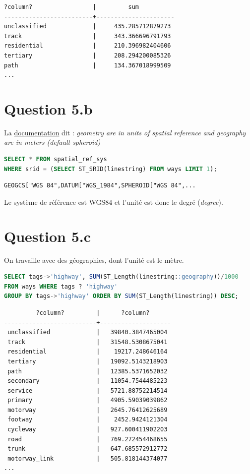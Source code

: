 \documentclass[12pt,a4paper]{article}
\begin{document}
\begin{lstlisting}
?column?                 |         sum          
-------------------------+----------------------
unclassified             |     435.285712879273
track                    |     343.366696791793
residential              |     210.396982404606
tertiary                 |     208.294200085326
path                     |     134.367018999509
...
\end{lstlisting}

\vspace{1cm}
\section*{Question 5.b}

La \href{http://postgis.org/docs/ST_Length.html}{documentation} dit : \textit{geometry are in units of spatial reference and geography are in meters (default spheroid)}

\begin{lstlisting}[language=SQL]
SELECT * FROM spatial_ref_sys
WHERE srid = (SELECT ST_SRID(linestring) FROM ways LIMIT 1);
\end{lstlisting}

\begin{lstlisting}
GEOGCS["WGS 84",DATUM["WGS_1984",SPHEROID["WGS 84",...
\end{lstlisting}

Le système de référence est WGS84 et l'unité est donc le degré (\textit{degree}).

\vspace{1cm}
\section*{Question 5.c}

On travaille avec des géographies, dont l'unité est le mètre.

\begin{lstlisting}[language=SQL]
SELECT tags->'highway', SUM(ST_Length(linestring::geography))/1000
FROM ways WHERE tags ? 'highway'
GROUP BY tags->'highway' ORDER BY SUM(ST_Length(linestring)) DESC;
\end{lstlisting}

\begin{lstlisting}
         ?column?         |      ?column?      
--------------------------+--------------------
 unclassified             |   39840.3847465004
 track                    |   31548.5308675041
 residential              |    19217.248646164
 tertiary                 |   19092.5143218903
 path                     |   12385.5371652032
 secondary                |   11054.7544485223
 service                  |   5721.88752214514
 primary                  |   4905.59039039862
 motorway                 |   2645.76412625689
 footway                  |    2452.9424121304
 cycleway                 |   927.600411902203
 road                     |   769.272454468655
 trunk                    |   647.685572912772
 motorway_link            |   505.818144374077
...
\end{lstlisting}
\end{document}
